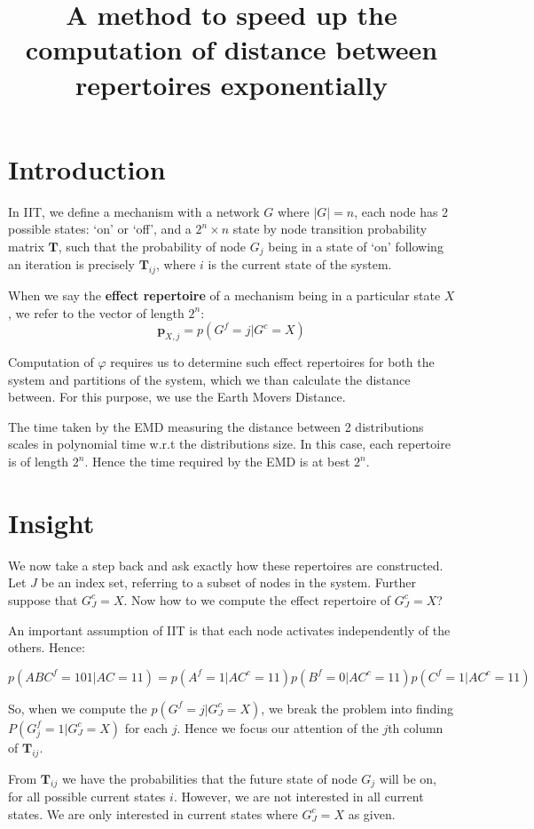 \documentclass[12pt,a4paper]{article}
\title{A method to speed up the computation of distance between repertoires exponentially}
\date{}
\begin{document}
	\maketitle 
	
	\section{Introduction}
	In IIT, we define a mechanism with a network $G$ where $|G|=n$, each node has 2 possible states: `on' or `off', and a $2^n\times n$ state by node transition probability matrix $\mathbf{T}$, such that the probability of node $G_j$ being in a state of `on' following an iteration is precisely $\mathbf{T}_{ij}$, where $i$ is the current state of the system.
	
	When we say the \textbf{effect repertoire} of a mechanism being in a particular state $X$, we refer to the vector of length $2^n$:
	\[\mathbf{p}_{X,j} = p(G^f = j|G^c=X)\]
	
	Computation of $\varphi$ requires us to determine such effect repertoires for both the system and partitions of the system, which we than calculate the distance between. For this purpose, we use the Earth Movers Distance. 
	
	The time taken by the EMD measuring the distance between 2 distributions scales in polynomial time w.r.t the distributions size. In this case, each repertoire is of length $2^n$. Hence the time required by the EMD is at best $2^n$.
	
	\section{Insight}
	We now take a step back and ask exactly how these repertoires are constructed. Let $J$ be an index set, referring to a subset of nodes in the system. Further suppose that $G_J^c= X$. Now how to we compute the effect repertoire of $G_J^c = X$?
	
	An important assumption of IIT is that each node activates independently of the others. Hence:
	
	\[p(ABC^f = 101|AC = 11) = p(A^f=1|AC^c=11)p(B^f=0|AC^c=11)p(C^f=1|AC^c=11)\]
	
	So, when we compute the $ p(G^f=j|G_J^c=X) $, we break the problem into finding $P(G^f_j = 1|G^c_J=X)$ for each $j$. Hence we focus our attention of the $j$th column of $\mathbf{T}_{ij}$.
	
	From $\mathbf{T}_{ij}$ we have the probabilities that the future state of node $G_j$ will be on, for all possible current states $i$. However, we are not interested in all current states. We are only interested in current states where $G^c_J =  X$ as given.
	
\end{document}
